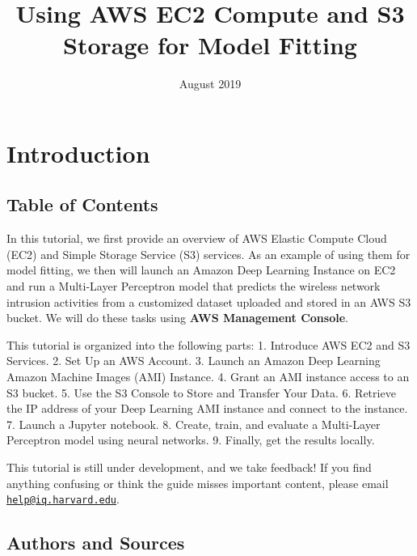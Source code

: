 \documentclass[]{book}
\title{Using AWS EC2 Compute and S3 Storage for Model Fitting}
\author{}
\date{August 2019}
\begin{document}
\maketitle

{
\setcounter{tocdepth}{1}
\tableofcontents
}
\hypertarget{introduction}{%
\chapter*{Introduction}\label{introduction}}

\hypertarget{table-of-contents}{%
\section*{Table of Contents}\label{table-of-contents}}

In this tutorial, we first provide an overview of AWS Elastic Compute Cloud (EC2) and Simple Storage Service (S3) services. As an example of using them for model fitting, we then will launch an Amazon Deep Learning Instance on EC2 and run a Multi-Layer Perceptron model that predicts the wireless network intrusion activities from a customized dataset uploaded and stored in an AWS S3 bucket. We will do these tasks using \textbf{AWS Management Console}.

This tutorial is organized into the following parts:
1. Introduce AWS EC2 and S3 Services.
2. Set Up an AWS Account.
3. Launch an Amazon Deep Learning Amazon Machine Images (AMI) Instance.
4. Grant an AMI instance access to an S3 bucket.
5. Use the S3 Console to Store and Transfer Your Data.
6. Retrieve the IP address of your Deep Learning AMI instance and connect to the instance.
7. Launch a Jupyter notebook.
8. Create, train, and evaluate a Multi-Layer Perceptron model using neural networks.
9. Finally, get the results locally.

This tutorial is still under development, and we take feedback! If you find anything confusing or think the guide misses important content, please email \href{mailto:help@iq.harvard.edu}{\nolinkurl{help@iq.harvard.edu}}.

\hypertarget{authors-and-sources}{%
\section*{Authors and Sources}\label{authors-and-sources}}
\end{document}
